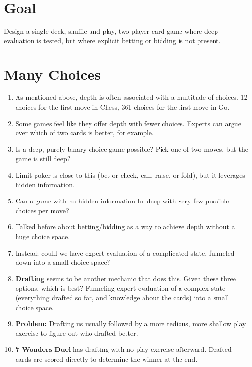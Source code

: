 \documentclass[12pt]{article}
\begin{document}
\section{Goal}

Design a single-deck, shuffle-and-play, two-player card game where deep evaluation is tested, but where explicit betting or bidding is not present.


\section{Many Choices}

\begin{enumerate}

\item As mentioned above, depth is often associated with a multitude of choices.  12 choices for the first move in Chess, 361 choices for the first move in Go.

\item Some games feel like they offer depth with fewer choices.  Experts can argue over which of two cards is better, for example.

\item Is a deep, purely binary choice game possible?  Pick one of two moves, but the game is still deep?

\item Limit poker is close to this (bet or check, call, raise, or fold), but it leverages hidden information.

\item Can a game with no hidden information be deep with very few possible choices per move?

\item Talked before about betting/bidding as a way to achieve depth without a huge choice space.

\item Instead:  could we have expert evaluation of a complicated state, funneled down into a small choice space?

\item {\bf Drafting} seems to be another mechanic that does this.  Given these three options, which is best?  Funneling expert evaluation of a complex state (everything drafted so far, and knowledge about the cards) into a small choice space.

\item {\bf Problem:} Drafting us usually followed by a more tedious, more shallow play exercise to figure out who drafted better.

\item {\bf 7 Wonders Duel} has drafting with no play exercise afterward.  Drafted cards are scored directly to determine the winner at the end.

\end{enumerate}
\end{document}
